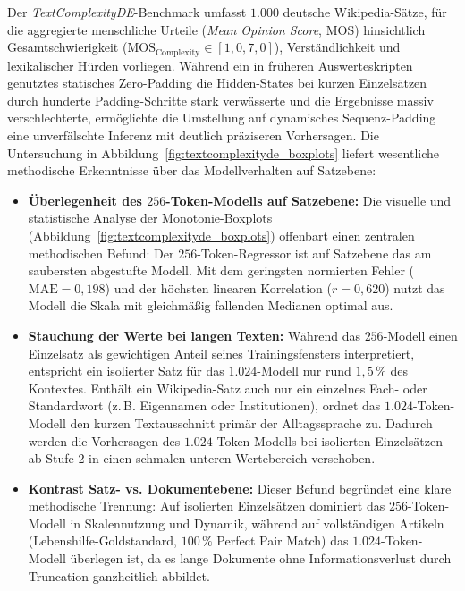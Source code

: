 Der \textit{TextComplexityDE}-Benchmark \citep{naderi2019textcomplexityde} umfasst $1.000$ deutsche Wikipedia-Sätze, für die aggregierte menschliche Urteile (\textit{Mean Opinion Score}, MOS) hinsichtlich Gesamtschwierigkeit ($\text{MOS}_{\text{Complexity}} \in [1{,}0, 7{,}0]$), Verständlichkeit und lexikalischer Hürden vorliegen. Während ein in früheren Auswerteskripten genutztes statisches Zero-Padding die Hidden-States bei kurzen Einzelsätzen durch hunderte Padding-Schritte stark verwässerte und die Ergebnisse massiv verschlechterte, ermöglichte die Umstellung auf dynamisches Sequenz-Padding eine unverfälschte Inferenz mit deutlich präziseren Vorhersagen. Die Untersuchung in Abbildung~\ref{fig:textcomplexityde_boxplots} liefert wesentliche methodische Erkenntnisse über das Modellverhalten auf Satzebene:
\begin{itemize}
    \item \textbf{Überlegenheit des $256$-Token-Modells auf Satzebene:} Die visuelle und statistische Analyse der Monotonie-Boxplots (Abbildung~\ref{fig:textcomplexityde_boxplots}) offenbart einen zentralen methodischen Befund: Der $256$-Token-Regressor ist auf Satzebene das am saubersten abgestufte Modell. Mit dem geringsten normierten Fehler ($\text{MAE} = 0{,}198$) und der höchsten linearen Korrelation ($r = 0{,}620$) nutzt das Modell die Skala mit gleichmäßig fallenden Medianen optimal aus.
    \item \textbf{Stauchung der Werte bei langen Texten:} Während das $256$-Modell einen Einzelsatz als gewichtigen Anteil seines Trainingsfensters interpretiert, entspricht ein isolierter Satz für das $1.024$-Modell nur rund $1{,}5\,\%$ des Kontextes. Enthält ein Wikipedia-Satz auch nur ein einzelnes Fach- oder Standardwort (z.\,B. Eigennamen oder Institutionen), ordnet das $1.024$-Token-Modell den kurzen Textausschnitt primär der Alltagssprache zu. Dadurch werden die Vorhersagen des $1.024$-Token-Modells bei isolierten Einzelsätzen ab Stufe 2 in einen schmalen unteren Wertebereich verschoben.
    \item \textbf{Kontrast Satz- vs. Dokumentebene:} Dieser Befund begründet eine klare methodische Trennung: Auf isolierten Einzelsätzen dominiert das $256$-Token-Modell in Skalennutzung und Dynamik, während auf vollständigen Artikeln (Lebenshilfe-Goldstandard, $100\,\%$ Perfect Pair Match) das $1.024$-Token-Modell überlegen ist, da es lange Dokumente ohne Informationsverlust durch Truncation ganzheitlich abbildet.
\end{itemize}

